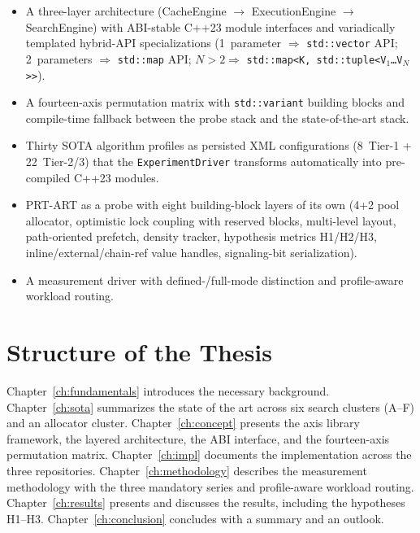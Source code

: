 \begin{itemize}
  \item A three-layer architecture (CacheEngine $\to$ ExecutionEngine $\to$
        SearchEngine) with ABI-stable C++23 module interfaces and variadically
        templated hybrid-API specializations (1~parameter $\Rightarrow$
        \texttt{std::vector} API; 2~parameters $\Rightarrow$ \texttt{std::map}
        API; $N>2 \Rightarrow$ \texttt{std::map<K, std::tuple<V$_1$\ldots V$_N$>>}).
  \item A fourteen-axis permutation matrix with \texttt{std::variant} building
        blocks and compile-time fallback between the probe stack and the
        state-of-the-art stack.
  \item Thirty SOTA algorithm profiles as persisted XML configurations (8~Tier-1
        + 22~Tier-2/3) that the \texttt{ExperimentDriver} transforms automatically
        into pre-compiled C++23 modules.
  \item PRT-ART as a probe with eight building-block layers of its own (4+2 pool
        allocator, optimistic lock coupling with reserved blocks, multi-level
        layout, path-oriented prefetch, density tracker, hypothesis metrics
        H1/H2/H3, inline/external/chain-ref value handles, signaling-bit
        serialization).
  \item A measurement driver with defined-/full-mode distinction and
        profile-aware workload routing.
\end{itemize}

\section{Structure of the Thesis}\label{sec:structure}

Chapter~\ref{ch:fundamentals} introduces the necessary background. Chapter~\ref{ch:sota}
summarizes the state of the art across six search clusters (A--F) and an
allocator cluster. Chapter~\ref{ch:concept} presents the axis library framework,
the layered architecture, the ABI interface, and the fourteen-axis permutation
matrix. Chapter~\ref{ch:impl} documents the implementation across the three
repositories. Chapter~\ref{ch:methodology} describes the measurement methodology
with the three mandatory series and profile-aware workload routing.
Chapter~\ref{ch:results} presents and discusses the results, including the
hypotheses H1--H3. Chapter~\ref{ch:conclusion} concludes with a summary and an
outlook.
